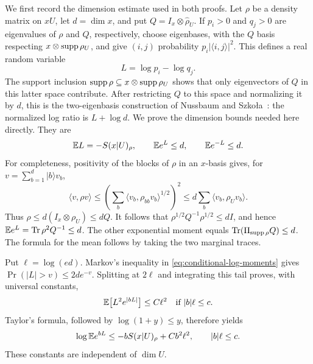 We first record the dimension estimate used in both proofs.  Let $\rho$
be a density matrix on $xU$, let $d=\dim x$, and put
$Q=I_x\otimes\widehat\rho_U$.  If $p_i>0$ and $q_j>0$ are eigenvalues
of $\rho$ and $Q$, respectively, choose eigenbases, with the $Q$ basis
respecting $x\otimes\operatorname{supp}\rho_U$, and give $(i,j)$
probability $p_i|\langle i,j\rangle|^2$.  This defines a real random
variable
\[
 L=\log p_i-\log q_j.
\]
The support inclusion
$\operatorname{supp}\rho\subseteq x\otimes\operatorname{supp}\rho_U$ shows that only eigenvectors
of $Q$ in this latter space contribute.  After restricting $Q$ to
this space and normalizing it by $d$, this is the two-eigenbasis
construction of Nussbaum and
Szko\l a~\cite[Section~3, equation~(11)]{NussbaumSzkola2009}:
the normalized log ratio is $L+\log d$.  We prove the dimension bounds
needed here directly.  They are
\begin{equation}\label{eq:conditional-log-moments}
 \mathbb E L=-S(x|U)_\rho,
 \qquad \mathbb E e^{L}\le d,
 \qquad \mathbb E e^{-L}\le d.
\end{equation}
For completeness, positivity of the blocks of $\rho$ in an $x$-basis
gives, for $v=\sum_{b=1}^d|b\rangle v_b$,
\[
 \langle v,\rho v\rangle
 \le\left(\sum_b\langle v_b,\rho_{bb}v_b\rangle^{1/2}\right)^2
 \le d\sum_b\langle v_b,\rho_Uv_b\rangle.
\]
Thus $\rho\le d(I_x\otimes\rho_U)\le dQ$.  It follows that
$\rho^{1/2}Q^{-1}\rho^{1/2}\le dI$, and hence
$\mathbb E e^L=\operatorname{Tr}\rho^2Q^{-1}\le d$.  The other exponential moment equals
$\operatorname{Tr}(\Pi_{\operatorname{supp}\rho}Q)\le d$.  The formula for the mean follows by
taking the two marginal traces.

Put $\ell=\log(ed)$.  Markov's inequality in
\eqref{eq:conditional-log-moments} gives
$\Pr(|L|>v)\le2d e^{-v}$.  Splitting at $2\ell$ and integrating this
tail proves, with universal constants,
\[
 \mathbb E\big[L^2e^{|bL|}\big]\le C\ell^2
 \quad\hbox{if } |b|\ell\le c.
\]
Taylor's formula, followed by $\log(1+y)\le y$, therefore yields
\begin{equation}\label{eq:conditional-log-mgf}
 \log\mathbb E e^{bL}\le -bS(x|U)_\rho+C b^2\ell^2,
 \qquad |b|\ell\le c.
\end{equation}
These constants are independent of $\dim U$.

